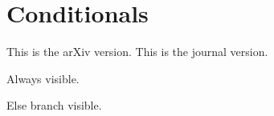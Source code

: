 \section{Conditionals}

\ifarxiv
This is the arXiv version.
\else
This is the journal version.
\fi

\iftrue
Always visible.
\fi

\iffalse
Never visible.
\else
Else branch visible.
\fi
